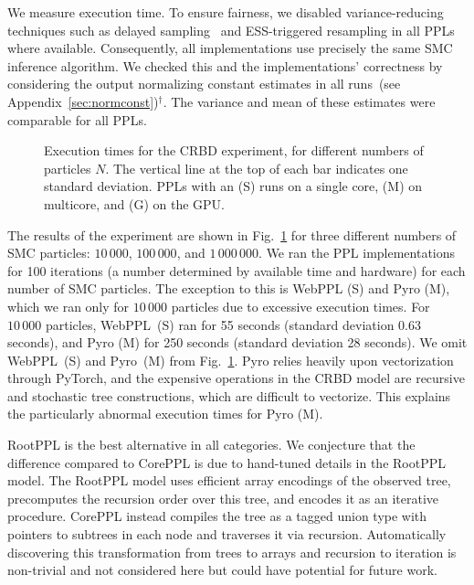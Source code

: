 \documentclass[runningheads]{llncs}
\begin{document}
We measure execution time.
To ensure fairness, we disabled variance-reducing techniques such as delayed sampling~\cite{murray2018delayed} and ESS-triggered resampling in all PPLs where available.
Consequently, all implementations use precisely the same SMC inference algorithm.
We checked this and the implementations' correctness by considering the output normalizing constant estimates in all runs\ifextended\ (see Appendix~\ref{sec:normconst})\else$^\dagger$\fi.
The variance and mean of these estimates were comparable for all PPLs.

\begin{figure}[tb]
  \resizebox{\textwidth}{!}{}
  \caption{Execution times for the CRBD experiment, for different numbers of particles $N$. The vertical line at the top of each bar indicates one standard deviation. PPLs with an (S) runs on a single core, (M) on multicore, and (G) on the GPU.}
  \label{fig:expcrbd}
\end{figure}
The results of the experiment are shown in Fig.~\ref{fig:expcrbd} for three different numbers of SMC particles: $10\,000$, $100\,000$, and $1\,000\,000$.
We ran the PPL implementations for 100 iterations (a number determined by available time and hardware) for each number of SMC particles.
The exception to this is WebPPL (S) and Pyro (M), which we ran only for $10\,000$ particles due to excessive execution times.
For $10\,000$ particles, WebPPL~(S) ran for 55 seconds (standard deviation 0.63 seconds), and Pyro (M) for 250 seconds (standard deviation 28 seconds).
We omit WebPPL~(S) and Pyro~(M) from Fig.~\ref{fig:expcrbd}.
Pyro relies heavily upon vectorization through PyTorch, and the expensive operations in the CRBD model are recursive and stochastic tree constructions, which are difficult to vectorize.
This explains the particularly abnormal execution times for Pyro (M).

RootPPL is the best alternative in all categories.
We conjecture that the difference compared to CorePPL is due to hand-tuned details in the RootPPL model.
The RootPPL model uses efficient array encodings of the observed tree, precomputes the recursion order over this tree, and encodes it as an iterative procedure.
CorePPL instead compiles the tree as a tagged union type with pointers to subtrees in each node and traverses it via recursion.
Automatically discovering this transformation from trees to arrays and recursion to iteration is non-trivial and not considered here but could have potential for future work.
\end{document}
